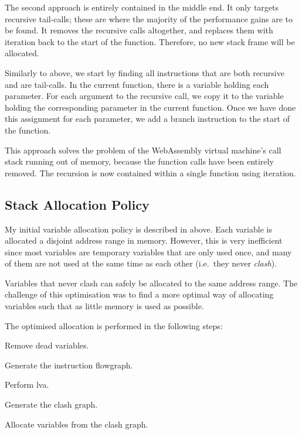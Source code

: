 \documentclass[00-main.tex]{subfiles}
\begin{document}
The second approach is entirely contained in the middle end.
It only targets recursive tail-calls; these are where the majority of the performance gains are to be found.
It removes the recursive calls altogether, and replaces them with iteration back to the start of the function.
Therefore, no new stack frame will be allocated.

Similarly to above, we start by finding all  instructions that are both recursive and are tail-calls.
In the current function, there is a variable holding each parameter.
For each argument to the recursive call, we copy it to the variable holding the corresponding parameter in the current function.
Once we have done this assignment for each parameter, we add a branch instruction to the start of the function.

This approach solves the problem of the WebAssembly virtual machine's call stack running out of memory, because the function calls have been entirely removed.
The recursion is now contained within a single function using iteration.

\subsection{Stack Allocation Policy}\label{sec:impl:optimised stack allocation}

My initial variable allocation policy is described in  above.
Each variable is allocated a disjoint address range in memory.
However, this is very inefficient since most variables are temporary variables that are only used once, and many of them are not used at the same time as each other (i.e.\ they never \emph{clash}).

Variables that never clash can safely be allocated to the same address range.
The challenge of this optimisation was to find a more optimal way of allocating variables such that as little memory is used as possible.

The optimised allocation is performed in the following steps:
\begin{EnumerateAlgorithm}
\item Remove dead variables.
\item Generate the instruction flowgraph.
\item Perform \acrlong{lva}.
\item Generate the clash graph.
\item Allocate variables from the clash graph.
\end{EnumerateAlgorithm}
\end{document}
